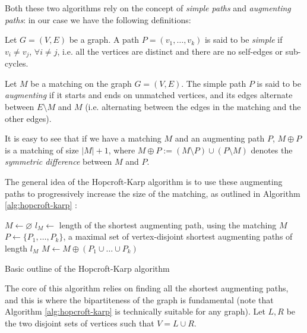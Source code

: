 Both these two algorithms rely on the concept of \emph{simple paths} and \emph{augmenting paths}: in our case we have the following definitions:

\begin{definition}
	Let $G=(V,E)$ be a graph. A path $P=(v_1,\dots,v_k)$ is said to be \emph{simple} if $v_i \neq v_j$, $\forall i \neq j$, i.e. all the vertices are distinct and there are no self-edges or sub-cycles. 
\end{definition}

\begin{definition}
	Let $M$ be a matching on the graph $G=(V,E)$. The simple path $P$ is said to be \emph{augmenting} if it starts and ends on unmatched vertices, and its edges alternate between $E \setminus M$ and $M$ (i.e. alternating between the edges in the matching and the other edges).
\end{definition}

It is easy to see that if we have a matching $M$ and an augmenting path $P$, $M \oplus P$ is a matching of size $|M|+1$, where $M \oplus P := (M \setminus P) \cup (P \setminus M)$ denotes the \emph{symmetric difference} between $M$ and $P$. 

The general idea of the Hopcroft-Karp algorithm is to use these augmenting paths to progressively increase the size of the matching, as outlined in Algorithm \ref{alg:hopcroft-karp} \cite{hopcroft_karp}:

\begin{algorithm}[h]
	\begin{algorithmic}
		\State $M \gets \varnothing$
		\Repeat
		\State $l_M \gets$ length of the shortest augmenting path, using the matching $M$
		\State $P \gets \{ P_1,\dots,P_k \}$, a maximal set of vertex-disjoint shortest augmenting paths of length $l_M$
		\State $M \gets M \oplus (P_1 \cup \dots \cup P_k )$
	\end{algorithmic}
	\caption{Basic outline of the Hopcroft-Karp algorithm} \label{alg:hopcroft-karp}
\end{algorithm}

The core of this algorithm relies on finding all the shortest augmenting paths, and this is where the bipartiteness of the graph is fundamental (note that Algorithm \ref{alg:hopcroft-karp} is technically suitable for any graph). Let $L,R$ be the two disjoint sets of vertices such that $V = L \cup R$.

